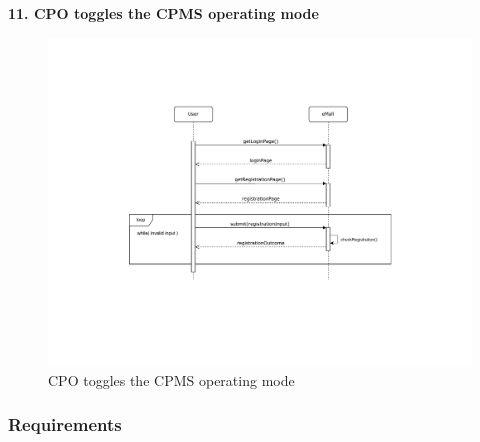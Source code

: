 \documentclass[11pt]{article}
\begin{document}
\begin{description}
    \item \textbf{11. CPO toggles the CPMS operating mode}
    \begin{figure}[!ht]
        \centering
        \includegraphics[page={11}, trim=5cm 9cm 5.7cm 3.5cm, width=0.8\linewidth, clip]{SequenceDiagrams.pdf}
        \caption{CPO toggles the CPMS operating mode}
    \end{figure}
\end{description}

\subsubsection{Requirements}
\end{document}
